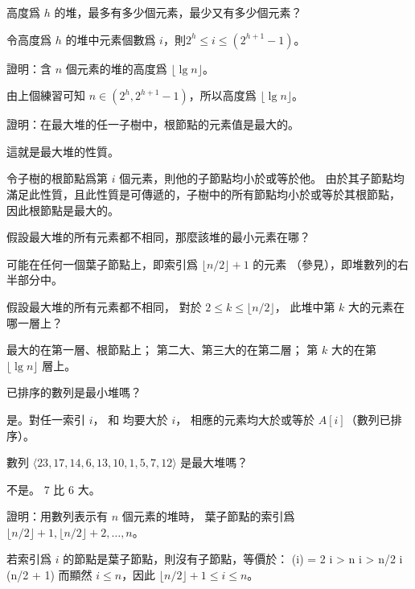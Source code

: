 \startsection[
  reference=section:heaps,
  title={Heaps},
]

\startEXERCISE
高度爲 $h$ 的堆，最多有多少個元素，最少又有多少個元素？
\stopEXERCISE

\startANSWER
令高度爲 $h$ 的堆中元素個數爲 $i$，則$2^h \le i \le (2^{h+1} - 1)$。
\stopANSWER

證明：含 $n$ 個元素的堆的高度爲 $\lfloor \lg{n} \rfloor$。
\stopEXERCISE

\startANSWER
由上個練習可知 $n \in (2^h, 2^{h+1} - 1)$，所以高度爲 $\lfloor \lg{n} \rfloor$。
\stopANSWER

\startEXERCISE
證明：在最大堆的任一子樹中，根節點的元素值是最大的。
\stopEXERCISE

\startANSWER
這就是最大堆的性質。

令子樹的根節點爲第 $i$ 個元素，則他的子節點均小於或等於他。
由於其子節點均滿足此性質，且此性質是可傳遞的，子樹中的所有節點均小於或等於其根節點，
因此根節點是最大的。
\stopANSWER

\startEXERCISE
假設最大堆的所有元素都不相同，那麼該堆的最小元素在哪？
\stopEXERCISE

\startANSWER
可能在任何一個葉子節點上，即索引爲 $\lfloor n/2 \rfloor + 1$ 的元素
（參見），即堆數列的右半部分中。
\stopANSWER

\startEXERCISE
假設最大堆的所有元素都不相同，
對於 $2\le k\le \lfloor n/2\rfloor$，
此堆中第 $k$ 大的元素在哪一層上？
\stopEXERCISE

\startANSWER
最大的在第一層、根節點上；
第二大、第三大的在第二層；
第 $k$ 大的在第 $\lfloor \lg n\rfloor$ 層上。
\stopANSWER

\startEXERCISE
已排序的數列是最小堆嗎？
\stopEXERCISE

\startANSWER
是。對任一索引 $i$，  和  均要大於 $i$，
相應的元素均大於或等於 $A[i]$（數列已排序）。
\stopANSWER

\startEXERCISE
數列 $\langle 23, 17, 14, 6, 13, 10, 1, 5, 7, 12 \rangle$ 是最大堆嗎？
\stopEXERCISE

\startANSWER
不是。 $7$ 比 $6$ 大。

\externalfigure[output/e6_1_6-1]

\stopANSWER

證明：用數列表示有 $n$ 個元素的堆時，
葉子節點的索引爲 $\lfloor n/2 \rfloor + 1,\lfloor n/2 \rfloor + 2, \ldots, n$。
\stopEXERCISE

\startANSWER
若索引爲 $i$ 的節點是葉子節點，則沒有子節點，等價於：
\startsplitformula\startmathalignment[n=1]
\NC {}(i) = 2 i > n \NR
\NC i > n/2 \NR
\NC i \ge (\lfloor n/2 \rfloor + 1) \NR
\stopmathalignment\stopsplitformula
而顯然 $i\le n$，因此 $\lfloor n/2 \rfloor + 1 \le i\le n$。
\stopANSWER

\stopsection%
